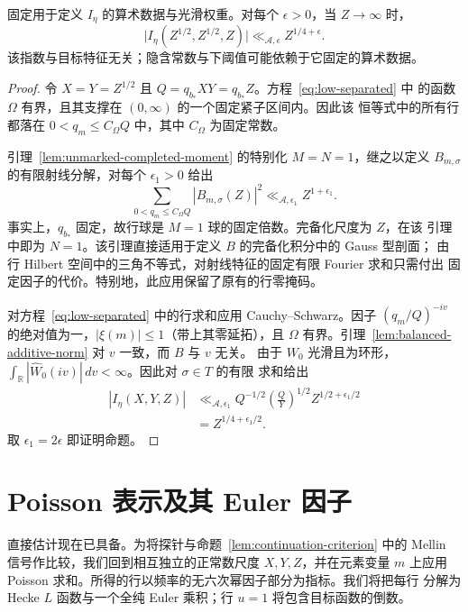 \begin{proposition}[平衡低估计]
\label{prop:balanced-low}
固定用于定义 $I_\eta$ 的算术数据与光滑权重。对每个 $\epsilon>0$，当
$Z\to\infty$ 时，
\[
 \bigl|I_\eta(Z^{1/2},Z^{1/2},Z)\bigr|
 \ll_{\mathcal A,\epsilon} Z^{1/4+\epsilon}.
\]
该指数与目标特征无关；隐含常数与下阈值可能依赖于它固定的算术数据。
\end{proposition}

\begin{proof}
令 $X=Y=Z^{1/2}$ 且 $Q=q_{b_*}XY=q_{b_*}Z$。方程~\eqref{eq:low-separated} 中
的函数 $\Omega$ 有界，且其支撑在 $(0,\infty)$ 的一个固定紧子区间内。因此该
恒等式中的所有行都落在 $0<q_m\le C_\Omega Q$ 中，其中 $C_\Omega$ 为固定常数。

引理~\ref{lem:unmarked-completed-moment} 的特别化 $M=N=1$，继之以定义
$B_{m,\sigma}$ 的有限射线分解，对每个 $\epsilon_1>0$ 给出
\[
 \sum_{0<q_m\le C_\Omega Q}|B_{m,\sigma}(Z)|^2
 \ll_{\mathcal A,\epsilon_1} Z^{1+\epsilon_1}.
\]
事实上，$q_{b_*}$ 固定，故行球是 $M=1$ 球的固定倍数。完备化尺度为 $Z$，在该
引理中即为 $N=1$。该引理直接适用于定义 $B$ 的完备化积分中的 Gauss 型剖面；
由行 Hilbert 空间中的三角不等式，对射线特征的固定有限 Fourier 求和只需付出
固定因子的代价。特别地，此应用保留了原有的行零掩码。

对方程~\eqref{eq:low-separated} 中的行求和应用 Cauchy--Schwarz。因子
$(q_m/Q)^{-iv}$ 的绝对值为一，$|\xi(m)|\le1$（带上其零延拓），且 $\Omega$
有界。引理~\ref{lem:balanced-additive-norm} 对 $v$ 一致，而 $B$ 与 $v$ 无关。
由于 $W_0$ 光滑且为环形，
$\int_{\mathbb R}|\widehat W_0(iv)|\,dv<\infty$。因此对 $\sigma\in T$ 的有限
求和给出
\[
 \begin{split}
 |I_\eta(X,Y,Z)|
 &\ll_{\mathcal A,\epsilon_1}
 Q^{-1/2}\left(\frac QY\right)^{1/2}Z^{1/2+\epsilon_1/2}\\
 &=Z^{1/4+\epsilon_1/2}.
 \end{split}
\]
取 $\epsilon_1=2\epsilon$ 即证明命题。
\end{proof}

\section{Poisson 表示及其 Euler 因子}
\label{sec:poisson-representation}

直接估计现在已具备。为将探针与命题~\ref{lem:continuation-criterion} 中的
Mellin 信号作比较，我们回到相互独立的正常数尺度 $X,Y,Z$，并在元素变量 $m$
上应用 Poisson 求和。所得的行以频率的无六次幂因子部分为指标。我们将把每行
分解为 Hecke $L$ 函数与一个全纯 Euler 乘积；行 $u=1$ 将包含目标函数的倒数。


